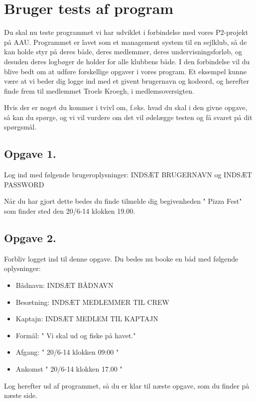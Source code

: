 \chapter{Bruger tests af program}\label{BrugerTestCases}

Du skal nu teste programmet vi har udviklet i forbindelse med vores P2-projekt på AAU. Programmet er lavet som et management system til en sejlklub, så de kan holde styr på deres både, deres medlemmer, deres undervisningsforløb, og desuden deres logbøger de holder for alle klubbens både. I den forbindelse vil du blive bedt om at udføre forskellige opgaver i vores program. Et eksempel kunne være at vi beder dig logge ind med et givent brugernavn og kodeord, og herefter finde frem til medlemmet Troels Kroegh, i medlemsoversigten.

Hvis der er noget du kommer i tvivl om, f.eks. hvad du skal i den givne opgave, så kan du spørge, og vi vil vurdere om det vil ødelægge testen og få svaret på dit spørgsmål.


\section{Opgave 1.}

Log ind med følgende brugeroplysninger: INDSÆT BRUGERNAVN og INDSÆT PASSWORD

Når du har gjort dette bedes du finde tilmelde dig begivenheden " Pizza Fest" som finder sted den 20/6-14  klokken 19.00.

\section{Opgave 2.}

Forbliv logget ind til denne opgave. Du bedes nu booke en båd med følgende oplysninger:

\begin{itemize}
	\item Bådnavn: INDSÆT BÅDNAVN
	\item Besætning: INDSÆT MEDLEMMER TIL CREW
	\item Kaptajn: INDSÆT MEDLEM TIL KAPTAJN
	\item Formål: " Vi skal ud og fiske på havet."
	\item Afgang: " 20/6-14 klokken 09:00 " 
	\item Ankomst " 20/6-14 klokken 17.00 "
\end{itemize}

Log herefter ud af programmet, så du er klar til næste opgave, som du finder på næste side.

